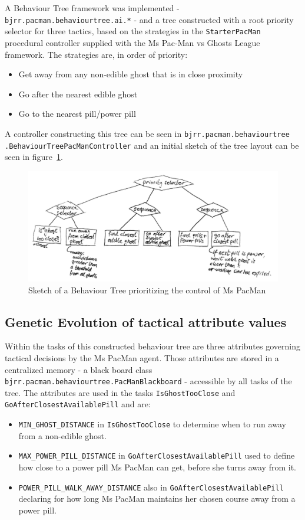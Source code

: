 \documentclass[conference]{IEEEtran}
\begin{document}
A Behaviour Tree framework was implemented - \texttt{bjrr.pacman.behaviourtree.ai.*} - and a tree constructed with a root priority selector for three tactics, based on the strategies in the \texttt{StarterPacMan} procedural controller supplied with the Ms Pac-Man vs Ghosts League framework.  The strategies are, in order of priority:  
\begin{itemize}
	\item Get away from any non-edible ghost that is in close proximity
	\item Go after the nearest edible ghost
	\item Go to the nearest pill/power pill
\end{itemize}
A controller constructing this tree can be seen in \texttt{bjrr.pacman.behaviourtree\\.BehaviourTreePacManController} and an initial sketch of the tree layout can be seen in figure~\ref{behaviourTreeSketch}.

\begin{figure}[htp]
\centerline{\includegraphics[width=1\columnwidth]{BehaviourTreeSketch.png}}
\caption{Sketch of a Behaviour Tree prioritizing the control of Ms PacMan}
\label{behaviourTreeSketch}
\end{figure}

\subsection{Genetic Evolution of tactical attribute values}

Within the tasks of this constructed behaviour tree are three attributes governing tactical decisions by the Ms PacMan agent.  Those attributes are stored in a centralized memory - a black board class \texttt{bjrr.pacman.behaviourtree.PacManBlackboard} - accessible by all tasks of the tree.  The attributes are used in the tasks \texttt{IsGhostTooClose} and \texttt{GoAfterClosestAvailablePill} and are:
\begin{itemize}
	\item \texttt{MIN\_GHOST\_DISTANCE} in \texttt{IsGhostTooClose} to determine when to run away from a non-edible ghost.
	\item \texttt{MAX\_POWER\_PILL\_DISTANCE} in \texttt{GoAfterClosestAvailablePill} used to define how close to a power pill Ms PacMan can get, before she turns away from it.
	\item \texttt{POWER\_PILL\_WALK\_AWAY\_DISTANCE} also in \texttt{GoAfterClosestAvailablePill} declaring for how long Ms PacMan maintains her chosen course away from a power pill.
\end{itemize}
\end{document}
